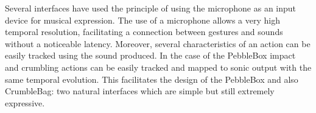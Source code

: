 Several interfaces have used the principle of using the microphone as an input device for musical expression. The use of a microphone allows a very high temporal resolution, facilitating a connection between gestures and sounds without a noticeable latency. Moreover, several characteristics of an action can be easily tracked using the sound produced. In the case of the PebbleBox impact and crumbling actions can be easily tracked and mapped to sonic output with the same temporal evolution. This facilitates the design of  the PebbleBox and also CrumbleBag: two natural interfaces which are simple but still extremely expressive. 

